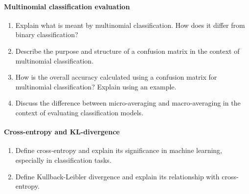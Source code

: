 \begin{advanced}
\paragraph*{Multinomial classification evaluation}
\begin{enumerate}
    \item Explain what is meant by multinomial classification. How does it differ from binary classification?
    \item Describe the purpose and structure of a confusion matrix in the context of multinomial classification.
    \item How is the overall accuracy calculated using a confusion matrix for multinomial classification? Explain using an example.
    \item Discuss the difference between micro-averaging and macro-averaging in the context of evaluating classification models.
\end{enumerate}
\paragraph*{Cross-entropy and KL-divergence}
\begin{enumerate}
  \item Define cross-entropy and explain its significance in machine learning, especially in classification tasks.
  \item Define Kullback-Leibler divergence and explain its relationship with cross-entropy.
\end{enumerate}
\end{advanced}
